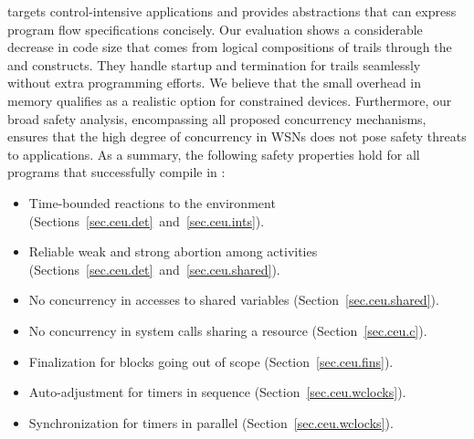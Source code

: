 \CEU targets control-intensive applications and provides abstractions that can 
express program flow specifications concisely.
%
Our evaluation shows a considerable decrease in code size that comes from 
logical compositions of trails through the  and  
constructs.
%
They handle startup and termination for trails seamlessly without extra 
programming efforts.
%
We believe that the small overhead in memory qualifies \CEU as a realistic 
option for constrained devices.
%
%
%
%
%
Furthermore, our broad safety analysis, encompassing all proposed concurrency 
mechanisms, ensures that the high degree of concurrency in WSNs does not pose 
safety threats to applications.
%
%
%
As a summary, the following safety properties hold for all programs that 
successfully compile in \CEU:

\begin{itemize}
\item Time-bounded reactions to the environment
        (Sections~\ref{sec.ceu.det}~and~\ref{sec.ceu.ints}).
\item Reliable weak and strong abortion among activities
        (Sections~\ref{sec.ceu.det}~and~\ref{sec.ceu.shared}).
\item No concurrency in accesses to shared variables
(Section~\ref{sec.ceu.shared}).
\item No concurrency in system calls sharing a resource
        (Section~\ref{sec.ceu.c}).
\item Finalization for blocks going out of scope
        (Section~\ref{sec.ceu.fins}).
\item Auto-adjustment for timers in sequence
        (Section~\ref{sec.ceu.wclocks}).
\item Synchronization for timers in parallel
        (Section~\ref{sec.ceu.wclocks}).
\end{itemize}

